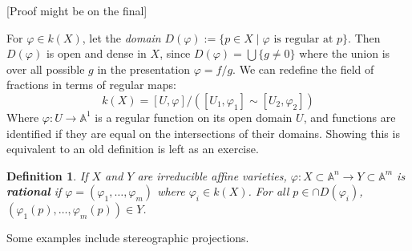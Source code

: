 \documentclass[12pt]{article}
\newcommand{\A}{\mathbb{A}}
\renewcommand{\phi}{\varphi}
\newtheorem{definition}{Definition}[section]
\begin{document}
    [Proof might be on the final]\par
    For $\phi \in k(X)$, let the \textit{domain} $D(\phi) := \{p \in X \mid \phi \text{ is regular at } p \}$. Then $D(\phi)$ is open and dense in $X$, since $D(\phi) = \bigcup \{g \neq 0\}$ where the union is over all possible $g$ in the presentation $\phi = f/g$. We can redefine the field of fractions in terms of regular maps:
    $$k(X) = [U, \phi]/([U_1, \phi_1] \sim [U_2, \phi_2])$$
    Where $\phi: U \to \A^1$ is a regular function on its open domain $U$, and functions are identified if they are equal on the intersections of their domains. Showing this is equivalent to an old definition is left as an exercise. \par
    \begin{definition}
        If $X$ and $Y$ are irreducible affine varieties, $\phi: X \subset \A^n \to Y \subset \A^m$ is \textbf{rational} if $\phi = (\phi_1, \dots, \phi_m)$ where $\phi_i \in k(X)$. For all $p \in \cap D(\phi_i)$, $(\phi_1(p), \dots, \phi_m(p)) \in Y$.
    \end{definition}
    Some examples include stereographic projections.
\end{document}
